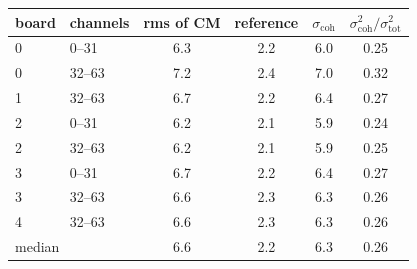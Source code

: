 \begin{tabular}{llcccc}
\toprule
board & channels & rms of CM & reference & $\sigma_\mathrm{coh}$ & $\sigma_\mathrm{coh}^2/\sigma_\mathrm{tot}^2$ \\
\midrule
0 & 0--31 & 6.3 & 2.2 & 6.0 & 0.25 \\
0 & 32--63 & 7.2 & 2.4 & 7.0 & 0.32 \\
1 & 32--63 & 6.7 & 2.2 & 6.4 & 0.27 \\
2 & 0--31 & 6.2 & 2.1 & 5.9 & 0.24 \\
2 & 32--63 & 6.2 & 2.1 & 5.9 & 0.25 \\
3 & 0--31 & 6.7 & 2.2 & 6.4 & 0.27 \\
3 & 32--63 & 6.6 & 2.3 & 6.3 & 0.26 \\
4 & 32--63 & 6.6 & 2.3 & 6.3 & 0.26 \\
\midrule
\multicolumn{2}{l}{median} & 6.6 & 2.2 & 6.3 & 0.26 \\
\bottomrule
\end{tabular}
